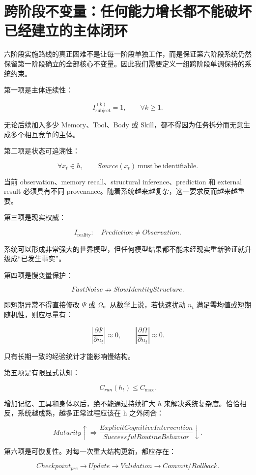 \section{跨阶段不变量：任何能力增长都不能破坏已经建立的主体闭环}

六阶段实施路线的真正困难不是让每一阶段单独工作，而是保证第六阶段系统仍然保留第一阶段确立的全部核心不变量。因此我们需要定义一组跨阶段单调保持的系统约束。

第一项是主体连续性：

\[
I_{\mathrm{subject}}^{(k)}=1,
\qquad
\forall k\geq1.
\]

无论后续加入多少 Memory、Tool、Body 或 Skill，都不得因为任务拆分而无意生成多个相互竞争的主体。

第二项是状态可追溯性：

\[
\forall x_t\in h,
\qquad
Source(x_t)
\ \mathrm{must\ be\ identifiable}.
\]

当前 observation、memory recall、structural inference、prediction 和 external result 必须具有不同 provenance。随着系统越来越复杂，这一要求反而越来越重要。

第三项是现实权威：

\[
I_{\mathrm{reality}}:
\quad
Prediction
\neq
Observation.
\]

系统可以形成非常强大的世界模型，但任何模型结果都不能未经现实重新验证就升级成“已发生事实”。

第四项是慢变量保护：

\[
FastNoise
\nrightarrow
SlowIdentityStructure.
\]

即短期异常不得直接修改 \(\Psi\) 或 \(\Omega\)。从数学上说，若快速扰动 \(n_t\) 满足零均值或短期随机性，则应尽量有：

\[
\left|
\frac{\partial\Psi}{\partial n_t}
\right|
\approx0,
\qquad
\left|
\frac{\partial\Omega}{\partial n_t}
\right|
\approx0.
\]

只有长期一致的经验统计才能影响慢结构。

第五项是有限显式认知：

\[
C_{run}(h_t)\leq C_{\max}.
\]

增加记忆、工具和身体以后，绝不能通过持续扩大 \(h\) 来解决系统复杂度。恰恰相反，系统越成熟，越多正常过程应该在 h 之外闭合：

\[
Maturity\uparrow
\Rightarrow
\frac{
ExplicitCognitiveIntervention
}{
SuccessfulRoutineBehavior
}
\downarrow.
\]

第六项是可恢复性。对每一次重大结构更新，都应存在：

\[
Checkpoint_{pre}
\rightarrow
Update
\rightarrow
Validation
\rightarrow
Commit/Rollback.
\]

